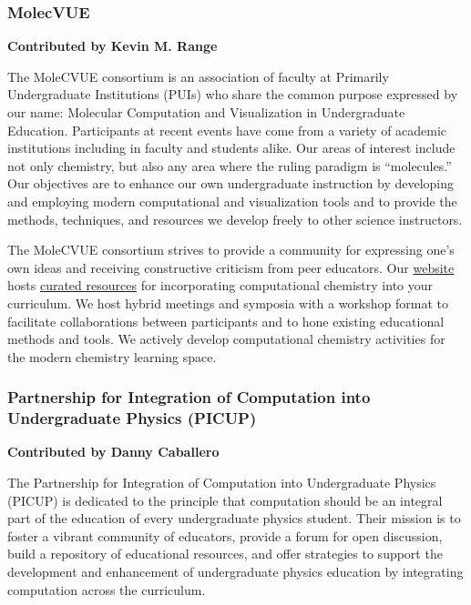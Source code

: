 \documentclass[9pt,review]{livecoms}
\begin{document}
\subsubsection{MolecVUE}

\textbf{Contributed by Kevin M. Range}

The MoleCVUE consortium is an association of faculty at Primarily Undergraduate Institutions (PUIs) who share the common purpose expressed by our name: Molecular Computation and Visualization in Undergraduate Education. 
Participants at recent events have come from a variety of academic institutions including in faculty and students alike. 
Our areas of interest include not only chemistry, but also any area where the ruling paradigm is “molecules.” 
Our objectives are to enhance our own undergraduate instruction by developing and employing modern computational and visualization tools and to provide the methods, techniques, and resources we develop freely to other science instructors.

The MoleCVUE consortium strives to provide a community for expressing one’s own ideas and receiving constructive criticism from peer educators. Our \href{https://sites.google.com/view/molecvue/events?authuser=0}{website} hosts \href{https://sites.google.com/view/molecvue/resources?authuser=0}{curated resources} for incorporating computational chemistry into your curriculum. We host hybrid meetings and symposia with a workshop format to facilitate collaborations between participants and to hone existing educational methods and tools. We actively develop computational chemistry activities for the modern chemistry learning space.

\subsubsection{Partnership for Integration of Computation into Undergraduate Physics (PICUP)}

\textbf{Contributed by Danny Caballero}

The Partnership for Integration of Computation into Undergraduate Physics (PICUP) is dedicated to the principle that computation should be an integral part of the education of every undergraduate physics student. Their mission is to foster a vibrant community of educators, provide a forum for open discussion, build a repository of educational resources, and offer strategies to support the development and enhancement of undergraduate physics education by integrating computation across the curriculum.
\end{document}
